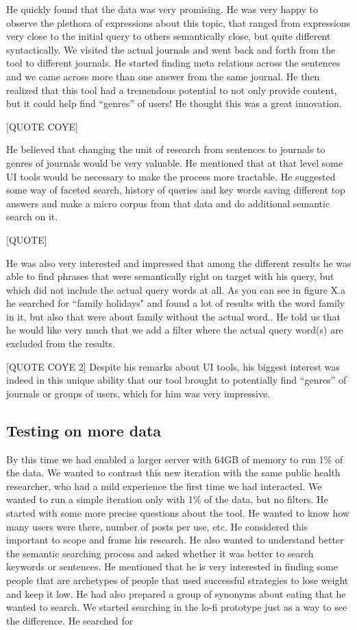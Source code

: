 \documentclass{sigchi}
\begin{document}
He quickly found that the data was very promising. He was very happy to observe the plethora of expressions about this topic, that ranged from expressions very close to the initial query to others semantically close, but quite different syntactically. We visited the actual journals and went back and forth from the tool to different journals. He started finding meta relations across the sentences and we came across more than one answer from the same journal. He then realized that this tool had a tremendous potential to not only provide content, but it could help find ``genres'' of users! He thought this was a great innovation. 

[QUOTE COYE]


He believed that changing the unit of research from sentences to journals to genres of journals would be very valuable. He mentioned that at that level some UI tools would be necessary to make the process more tractable. He suggested some way of faceted search, history of queries and key words saving different top answers and make a micro corpus from that data and do additional semantic search on it.

[QUOTE]

He was also very interested and impressed that among the different results he was able to find phrases that were semantically right on target with his query, but which did not include the actual query words at all. As you can see in figure X.a he searched for ``family holidays" and found a lot of results with the word family in it, but also that were about family without the actual word.. He told us that he would like very much that we add a filter where the actual query word(s) are excluded from the results.

[QUOTE COYE 2]
Despite his remarks about UI tools, his biggest interest was indeed in this unique ability that our tool brought to potentially find ``genres'' of journals or groups of users, which for him was very impressive.

\subsection{Testing on more data}

By this time we had enabled a larger server with  64GB of memory to run 1\% of the data. We wanted to contrast this new iteration with the same public health researcher, who had a mild experience the first time we had interacted. We wanted to run a simple iteration only with 1\% of the data, but no filters. He started with some more precise questions about the tool. He wanted to know how many users were there, number of posts per use, etc. He considered this important to scope and frame his research. He also wanted to understand better the semantic searching process and asked whether it was better to search keywords or sentences. He mentioned that he is very interested in finding some people that are archetypes of people that used successful strategies to lose weight and keep it low. He had also prepared a group of synonyms about eating that he wanted to search. We started searching in the lo-fi prototype just as a way to see the difference. He searched for 
\end{document}
